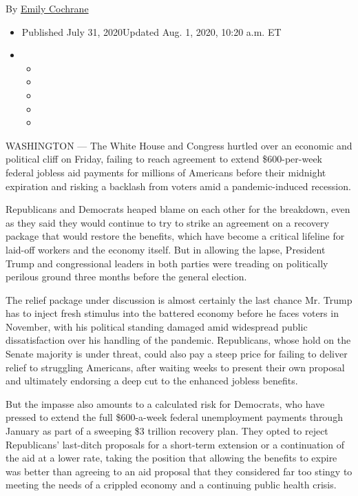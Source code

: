 By \href{https://www.nytimes.com/by/emily-cochrane}{Emily Cochrane}

\begin{itemize}
\item
  Published July 31, 2020Updated Aug. 1, 2020, 10:20 a.m. ET
\item
  \begin{itemize}
  \item
  \item
  \item
  \item
  \item
  \end{itemize}
\end{itemize}

WASHINGTON --- The White House and Congress hurtled over an economic and
political cliff on Friday, failing to reach agreement to extend
\$600-per-week federal jobless aid payments for millions of Americans
before their midnight expiration and risking a backlash from voters amid
a pandemic-induced recession.

Republicans and Democrats heaped blame on each other for the breakdown,
even as they said they would continue to try to strike an agreement on a
recovery package that would restore the benefits, which have become a
critical lifeline for laid-off workers and the economy itself. But in
allowing the lapse, President Trump and congressional leaders in both
parties were treading on politically perilous ground three months before
the general election.

The relief package under discussion is almost certainly the last chance
Mr. Trump has to inject fresh stimulus into the battered economy before
he faces voters in November, with his political standing damaged amid
widespread public dissatisfaction over his handling of the pandemic.
Republicans, whose hold on the Senate majority is under threat, could
also pay a steep price for failing to deliver relief to struggling
Americans, after waiting weeks to present their own proposal and
ultimately endorsing a deep cut to the enhanced jobless benefits.

But the impasse also amounts to a calculated risk for Democrats, who
have pressed to extend the full \$600-a-week federal unemployment
payments through January as part of a sweeping \$3 trillion recovery
plan. They opted to reject Republicans' last-ditch proposals for a
short-term extension or a continuation of the aid at a lower rate,
taking the position that allowing the benefits to expire was better than
agreeing to an aid proposal that they considered far too stingy to
meeting the needs of a crippled economy and a continuing public health
crisis.

